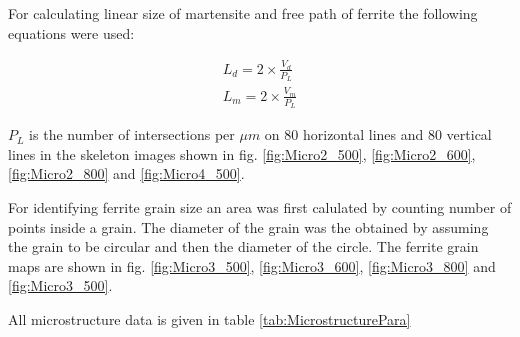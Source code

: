 \documentclass{article}
\begin{document}
For calculating linear size of martensite and free path of ferrite the following equations were used:

\begin{subequations}
    \begin{alignat}{2}
        L_d=2\times \frac{V_d}{P_L} \\
        L_m=2\times \frac{V_m}{P_L}
    \end{alignat}
    \label{Eq:LinSize}
\end{subequations}
 
 $P_L$ is the number of intersections per $\mu m$ on 80 horizontal lines and 80 vertical lines in the skeleton images shown in fig. \ref{fig:Micro2_500}, \ref{fig:Micro2_600}, \ref{fig:Micro2_800} and \ref{fig:Micro4_500}.
 
 For identifying ferrite grain size an area was first calulated by counting number of points inside a grain. The diameter of the grain was the obtained by assuming the grain to be circular and then the diameter of the circle. The ferrite grain maps are shown in fig. \ref{fig:Micro3_500}, \ref{fig:Micro3_600}, \ref{fig:Micro3_800} and \ref{fig:Micro3_500}.
 
 All microstructure data is given in table \ref{tab:MicrostructurePara}
\end{document}
